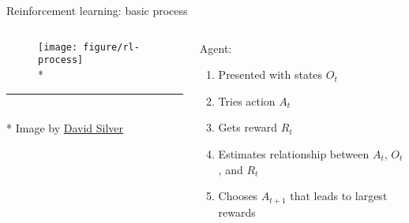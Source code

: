 \documentclass[handout]{beamer}
\begin{document}
\begin{frame}[fragile]{Reinforcement learning: basic process}
\begin{columns}
  \begin{column}{0.6\textwidth}
  \begin{figure}[H]
    \centering 
    \texttt{[image: figure/rl-process]} \\*
  \end{figure}
  \vspace{-0.6cm}
  \rule{5cm}{0.2pt} \\*
  \vspace{-6pt}
  {\footnotesize \quad Image by \href{http://www0.cs.ucl.ac.uk/staff/D.Silver/web/Teaching.html}{David Silver}}
  \end{column}
  \begin{column}{0.5\textwidth}
    Agent:
    \begin{enumerate}
      \item Presented with states $O_{t}$
      \item Tries action $A_{t}$
      \item Gets reward $R_{t}$
      \item Estimates relationship between $A_{t}$, $O_{t}$, and $R_{t}$
      \item Chooses $A_{t+1}$ that leads to largest rewards
    \end{enumerate}
  \end{column}
\end{columns}
\end{frame}

%
%
%




%
%
\end{document}
